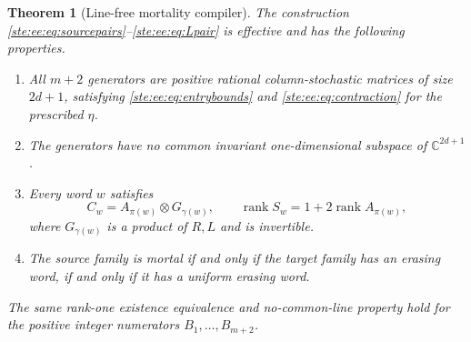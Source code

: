 \documentclass[11pt,letterpaper]{article}
\newtheorem{theorem}{Theorem}[section]
\theoremstyle{definition}
\theoremstyle{remark}
\newcommand{\C}{\mathbb C}
\newcommand{\rk}{\operatorname{rank}}
\begin{document}
\begin{theorem}[Line-free mortality compiler]\label{ste:ee:thm:linefree}
The construction \eqref{ste:ee:eq:sourcepairs}--\eqref{ste:ee:eq:Lpair} is effective and has the
following properties.
\begin{enumerate}[label=(\roman*)]
\item All $m+2$ generators are positive rational column-stochastic matrices of
size $2d+1$, satisfying \eqref{ste:ee:eq:entrybounds} and \eqref{ste:ee:eq:contraction} for the
prescribed $\eta$.
\item The generators have no common invariant one-dimensional subspace of
$\C^{2d+1}$.
\item Every word $w$ satisfies
\begin{equation}
  C_w=A_{\pi(w)}\otimes G_{\gamma(w)},\qquad
  \rk S_w=1+2\rk A_{\pi(w)},
  \label{ste:ee:eq:tensorrank}
\end{equation}
where $G_{\gamma(w)}$ is a product of $R,L$ and is invertible.
\item The source family is mortal if and only if the target family has an
erasing word, if and only if it has a uniform erasing word.
\end{enumerate}
The same rank-one existence equivalence and no-common-line property hold for the
positive integer numerators $B_1,\ldots,B_{m+2}$.
\end{theorem}
\end{document}

